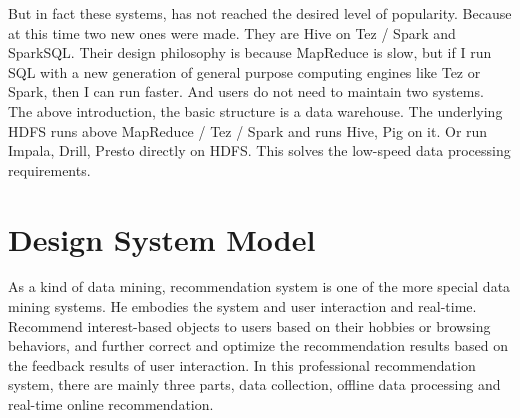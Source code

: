 \documentclass[sigconf]{acmart}
\begin{document}
\par But in fact these systems, has not reached the desired level of popularity. Because at this time two new ones were made. They are Hive on Tez / Spark and SparkSQL. Their design philosophy is because MapReduce is slow, but if I run SQL with a new generation of general purpose computing engines like Tez or Spark, then I can run faster. And users do not need to maintain two systems. The above introduction, the basic structure is a data warehouse. The underlying HDFS runs above MapReduce / Tez / Spark and runs Hive, Pig on it. Or run Impala, Drill, Presto directly on HDFS. This solves the low-speed data processing requirements.


\section{Design System Model}
As a kind of data mining, recommendation system is one of the more special data mining systems. He embodies the system and user interaction and real-time.\cite{Hong2013} Recommend interest-based objects to users based on their hobbies or browsing behaviors, and further correct and optimize the recommendation results based on the feedback results of user interaction.\cite{Zhou2017} In this professional recommendation system, there are mainly three parts, data collection, offline data processing and real-time online recommendation.
\end{document}
